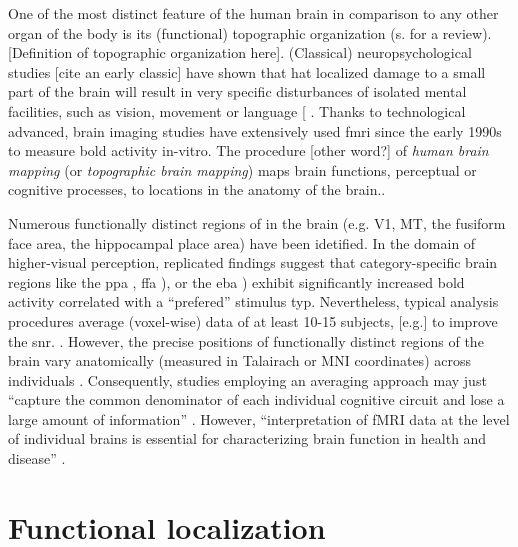 
%
One of the most distinct feature of the human brain in comparison to any other
organ of the body is its (functional) topographic organization (s.
\citep{debeck2008interpreting} for a review).
%
[Definition of topographic organization here].
%
(Classical) neuropsychological studies [cite an early classic] have shown that
hat localized damage to a small part of the brain will result in very speciﬁc
disturbances of isolated mental facilities, such as vision, movement or language
[\citep{rorden2004using} \citep{eickhoff2018topographic}.
%
Thanks to technological advanced, brain imaging studies have extensively used
\ac{fmri} since the early 1990s to measure \ac{bold} activity in-vitro.
%
The procedure [other word?] of \textit{human brain mapping} (or
\textit{topographic brain mapping}) maps brain functions, perceptual or
cognitive processes, to locations in the anatomy of the brain..

%
Numerous functionally distinct regions of in the brain (e.g. V1, MT, the
fusiform face area, the hippocampal place area) have been
idetified.
In the domain of higher-visual perception, replicated findings suggest that
category-specific brain regions like the \ac{ppa} \citep{epstein1998ppa},
\ac{ffa} \citep{kanwisher1997ffa}), or the \ac{eba} \citep{downing2001bodyarea})
exhibit significantly increased \ac{bold} activity correlated with a
``prefered'' stimulus typ.
%
Nevertheless, typical analysis procedures average (voxel-wise) data of at least
10-15 subjects, [e.g.] to improve the \ac{snr}.
%
.
%
However, the precise positions of functionally distinct regions of the brain
vary anatomically (measured in Talairach or MNI coordinates) across individuals
\citep{saxe2006divide}.
%
Consequently, studies employing an averaging approach may just ``capture the
common denominator of each individual cognitive circuit and lose a large amount
of information'' \citep{pinel2007fast}.
%
However, ``interpretation of fMRI data at the level of individual brains is
essential for characterizing brain function in health and disease''
\citep{dubois2016building}.


\section{Functional localization}

